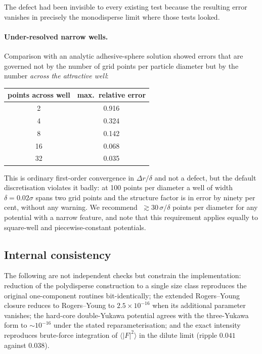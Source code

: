 The defect had been invisible to every existing test because the resulting
error vanishes in precisely the monodisperse limit where those tests looked.

\paragraph{Under-resolved narrow wells.}
\label{sec:welltrap}
Comparison with an analytic adhesive-sphere solution showed errors that are
governed not by the number of grid points per particle diameter but by the
number \emph{across the attractive well}:

\begin{center}\small
\begin{tabular}{cc}
\toprule
points across well & max.\ relative error\\
\midrule
2 & 0.916\\
4 & 0.324\\
8 & 0.142\\
16 & 0.068\\
32 & 0.035\\
\bottomrule
\end{tabular}
\end{center}

This is ordinary first-order convergence in $\Delta r/\delta$ and not a
defect, but the default discretisation violates it badly: at 100 points per
diameter a well of width $\delta = 0.02\sigma$ spans two grid points and the
structure factor is in error by ninety per cent, without any warning. We
recommend $\;\gtrsim 30\,\sigma/\delta$ points per diameter for any potential
with a narrow feature, and note that this requirement applies equally to
square-well and piecewise-constant potentials.

\subsection{Internal consistency}

The following are not independent checks but constrain the implementation:
reduction of the polydisperse construction to a single size class reproduces
the original one-component routines bit-identically; the extended
Rogers--Young closure reduces to Rogers--Young to $2.5\times10^{-16}$ when its
additional parameter vanishes; the hard-core double-Yukawa potential agrees
with the three-Yukawa form to $\sim10^{-16}$ under the stated
reparameterisation; and the exact intensity reproduces brute-force
integration of $\langle|F|^2\rangle$ in the dilute limit
(ripple $0.041$ against $0.038$).

